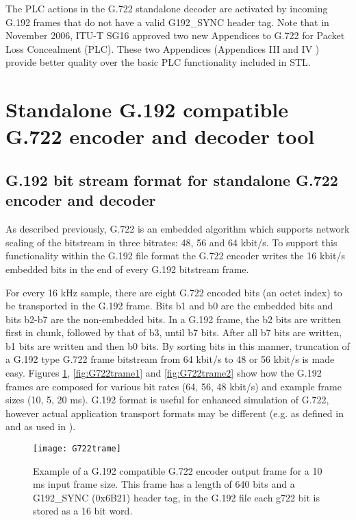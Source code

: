 The PLC actions in the G.722 standalone decoder are activated by
incoming G.192 frames that do not have a valid G192\_SYNC header
tag. Note that in November 2006, ITU-T SG16 approved two new
Appendices to G.722 for Packet Loss Concealment (PLC). These two
Appendices (Appendices III and IV \cite{G.722:AppIII,G.722:AppIV})
provide better quality over the basic PLC functionality included in
STL.

\section{Standalone G.192 compatible G.722 encoder and decoder tool}


\subsection{G.192 bit stream format for standalone G.722 encoder and decoder}

As described previously, G.722 is an embedded algorithm which supports
network scaling of the bitstream in three bitrates: 48, 56 and 64
kbit/s. To support this functionality within the G.192 file format the
G.722 encoder writes the 16 kbit/s embedded bits in the end of every
G.192 bitstream frame.
 
For every 16 kHz sample, there are eight G.722 encoded bits (an octet
index) to be transported in the G.192 frame. Bits b1 and b0 are the
embedded bits and bits b2-b7 are the non-embedded bits. In a G.192
frame, the b2 bits are written first in chunk, followed by that of b3,
until b7 bits. After all b7 bits are written, b1 bits are written and
then b0 bits. By sorting bits in this manner, truncation of a G.192
type G.722 frame bitstream from 64 kbit/s to 48 or 56 kbit/s is made
easy. Figures \ref{fig:G722trame}, \ref{fig:G722trame1} and
\ref{fig:G722trame2} show how the G.192 frames are composed for
various bit rates (64, 56, 48 kbit/s) and example frame sizes (10, 5,
20 ms). G.192 format is useful for enhanced simulation of G.722,
however actual application transport formats may be different (e.g. as
defined in \cite{G.722} and as used in \cite{G.722:RFC3551}).

\begin{figure}[h]
    \begin{center}
        \texttt{[image: G722trame]}
  \end{center}
  \caption{Example of a G.192 compatible G.722 encoder output frame for a 10 ms input frame size. This frame has a length of 640 bits and a G192\_SYNC (0x6B21) header tag, in the G.192 file each g722 bit is stored as a 16 bit word.
           \label{fig:G722trame}}
\end{figure}

